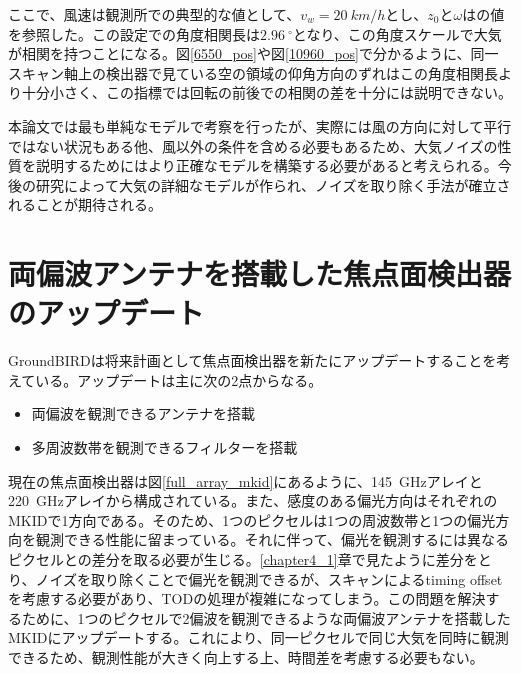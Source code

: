 ここで、風速は観測所での典型的な値として、$v_{w}=\SI{20}{km/h}$とし、$z_{0}$と$\omega$は\cite{nishinomiya}の値を参照した。この設定での角度相関長は$\SI{2.96}{^{\circ}}$となり、この角度スケールで大気が相関を持つことになる。図\ref{6550_pos}や図\ref{10960_pos}で分かるように、同一スキャン軸上の検出器で見ている空の領域の仰角方向のずれはこの角度相関長より十分小さく、この指標では回転の前後での相関の差を十分には説明できない。

本論文では最も単純なモデルで考察を行ったが、実際には風の方向に対して平行ではない状況もある他、風以外の条件を含める必要もあるため、大気ノイズの性質を説明するためにはより正確なモデルを構築する必要があると考えられる。今後の研究によって大気の詳細なモデルが作られ、ノイズを取り除く手法が確立されることが期待される。
\section{両偏波アンテナを搭載した焦点面検出器のアップデート}
GroundBIRDは将来計画として焦点面検出器を新たにアップデートすることを考えている。アップデートは主に次の2点からなる。
\begin{itemize}
  \item 両偏波を観測できるアンテナを搭載
  \item 多周波数帯を観測できるフィルターを搭載
\end{itemize}
現在の焦点面検出器は図\ref{full_array_mkid}にあるように、\SI{145}{GHz}アレイと\SI{220}{GHz}アレイから構成されている。また、感度のある偏光方向はそれぞれのMKIDで1方向である。そのため、1つのピクセルは1つの周波数帯と1つの偏光方向を観測できる性能に留まっている。それに伴って、偏光を観測するには異なるピクセルとの差分を取る必要が生じる。\ref{chapter4_1}章で見たように差分をとり、ノイズを取り除くことで偏光を観測できるが、スキャンによるtiming offsetを考慮する必要があり、TODの処理が複雑になってしまう。この問題を解決するために、1つのピクセルで2偏波を観測できるような両偏波アンテナを搭載したMKIDにアップデートする。これにより、同一ピクセルで同じ大気を同時に観測できるため、観測性能が大きく向上する上、時間差を考慮する必要もない。

